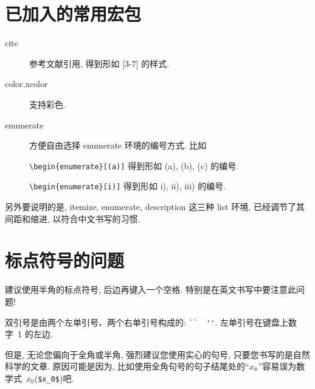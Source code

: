 \section{已加入的常用宏包}

\begin{description}
  \item[cite]  参考文献引用, 得到形如 [3-7] 的样式.
  \item[color,xcolor]  支持彩色.
  \item[enumerate]  方便自由选择 enumerate 环境的编号方式. 比如

        \verb|\begin{enumerate}[(a)]| 得到形如 (a), (b), (c) 的编号.


        \verb|\begin{enumerate}[i)]| 得到形如 i), ii), iii) 的编号.

\end{description}

另外要说明的是,  itemize, enumerate, description 这三种 list 环境, 已经调节了其间距和缩进,
以符合中文书写的习惯.

\section{标点符号的问题}

建议使用半角的标点符号, 后边再键入一个空格. 特别是在英文书写中要注意此问题!

双引号是由两个左单引号、两个右单引号构成的: \verb|``  ''|. 左单引号在键盘上数字~1 的左边.

但是, 无论您偏向于全角或半角, 强烈建议您使用实心的句号, 只要您书写的是自然科学的文章.
原因可能是因为, 比如使用全角句号的句子结尾处的``$x$。''容易误为数学式~$x_0$(\verb|$x_0$|)吧.
